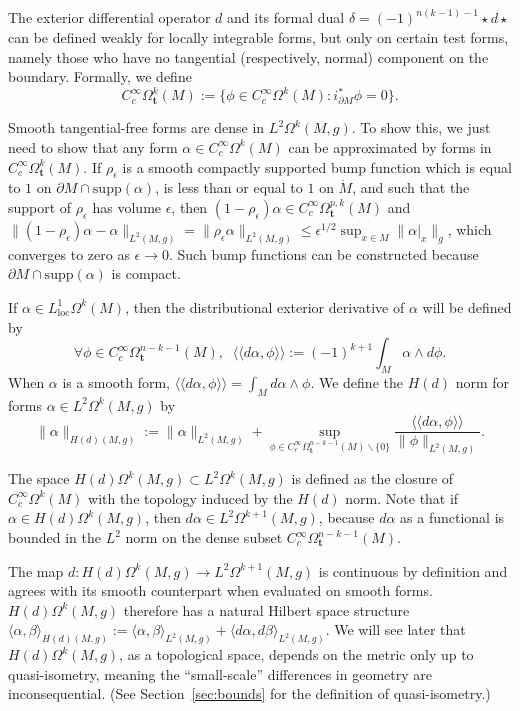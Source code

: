 \documentclass[11pt]{article}
\newcommand{\iprod}[1]{\langle #1 \rangle}
\begin{document}
The exterior differential operator $d$ and its formal dual $\delta = (-1)^{n(k-1) - 1}\star d\star$ can be defined weakly for locally integrable forms, but only on certain test forms, namely those who have no tangential (respectively, normal) component on the boundary. Formally, we define
\[
C^\infty_c\Omega^k_\mathbf{t}(M) := \{\phi \in C^\infty_c\Omega^k(M) : i_{\partial M}^*\phi = 0\}.
\]

Smooth tangential-free forms are dense in $L^2\Omega^k(M,g)$. To show this, we just need to show that any form $\alpha \in C^\infty_c\Omega^k(M)$ can be approximated by forms in $C^\infty_c\Omega^k_{\mathbf{t}}(M)$. If $\rho_\epsilon$ is a smooth compactly supported bump function which is equal to $1$ on $\partial M \cap \mathrm{supp}(\alpha)$, is less than or equal to $1$ on $\mathring{M}$, and such that the support of $\rho_\epsilon$ has volume $\epsilon$, then $(1 - \rho_\epsilon)\alpha \in C^\infty_c\Omega^{p,k}_{\mathbf{t}}(M)$ and $\|(1 - \rho_\epsilon)\alpha - \alpha\|_{L^2(M,g)} = \|\rho_\epsilon\alpha\|_{L^2(M,g)} \le \epsilon^{1/2} \sup_{x \in M} \|\alpha|_x\|_g$, which converges to zero as $\epsilon \to 0$. Such bump functions can be constructed because $\partial M \cap\mathrm{supp}(\alpha)$ is compact.

If $\alpha \in L^1_\mathrm{loc}\Omega^k(M)$, then the distributional exterior derivative of $\alpha$ will be defined by
\[
\forall \phi \in C^\infty_c\Omega^{n-k-1}_\mathbf{t}(M), \;\;\iprod{\iprod{d\alpha,\phi}} := (-1)^{k+1}\int_M \alpha \wedge d\phi.
\]
When $\alpha$ is a smooth form, $\iprod{\iprod{d\alpha,\phi}} = \int_M d\alpha \wedge \phi$.
We define the $H(d)$ norm for forms $\alpha \in L^2\Omega^k(M,g)$ by
\[
\|\alpha\|_{H(d)(M,g)} := \|\alpha\|_{L^2(M,g)} + \sup_{\phi \in C^\infty_c\Omega^{n-k-1}_\mathbf{t}(M) \backslash \{0\}} \frac{\iprod{\iprod{d\alpha,\phi}}}{\|\phi\|_{L^2(M,g)}}.
\]

The space $H(d)\Omega^k(M,g) \subset L^2\Omega^k(M,g)$ is defined as the closure of $C^\infty_c\Omega^k(M)$ with the topology induced by the $H(d)$ norm. Note that if $\alpha \in H(d)\Omega^k(M,g)$, then $d\alpha \in L^2\Omega^{k+1}(M,g)$, because $d\alpha$ as a functional is bounded in the $L^2$ norm on the dense subset $C^\infty_c\Omega^{n-k-1}_{\mathbf{t}}(M)$.

The map $d: H(d)\Omega^k(M,g) \to L^2\Omega^{k+1}(M,g)$ is continuous by definition and agrees with its smooth counterpart when evaluated on smooth forms. $H(d)\Omega^k(M,g)$ therefore has a natural Hilbert space structure $\iprod{\alpha,\beta}_{H(d)(M,g)} := \iprod{\alpha,\beta}_{L^2(M,g)} + \iprod{d\alpha,d\beta}_{L^2(M,g)}$. We will see later that $H(d)\Omega^k(M,g)$, as a topological space, depends on the metric only up to quasi-isometry, meaning the ``small-scale'' differences in geometry are inconsequential.  (See Section~\ref{sec:bounds} for the definition of quasi-isometry.)
\end{document}
